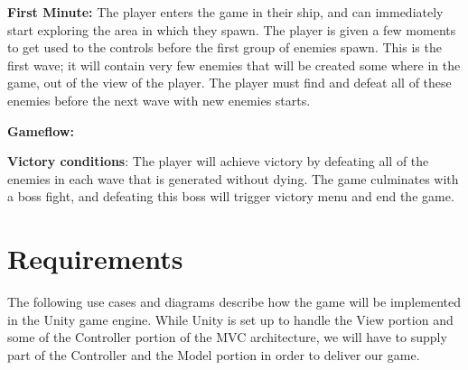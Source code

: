 \documentclass[12pt]{article}       %
\def\hs{\hspace{15pt}}
\begin{document}
{\bf First Minute: } The player enters the game in their ship, and can immediately start exploring the area in which they spawn. The player is given a few moments to get used to the controls before the first group of enemies spawn. This is the first wave; it will contain very few enemies that will be created some where in the game, out of the view of the player. The player must find and defeat all of these enemies before the next wave with new enemies starts. 

{\bf Gameflow:} 


{\bf Victory conditions}: The player will achieve victory by defeating all of the enemies in each wave that is generated without dying. The game culminates with a boss fight, and defeating this boss will trigger victory menu and end the game.

\section{Requirements} %
\label{sec:Requirements}

\hs The following use cases and diagrams describe how the game will be implemented in the Unity game engine. While Unity is set up to handle the View portion and some of the Controller portion of the MVC architecture, we will have to supply part of the Controller and the Model portion in order to deliver our game.
\end{document}
